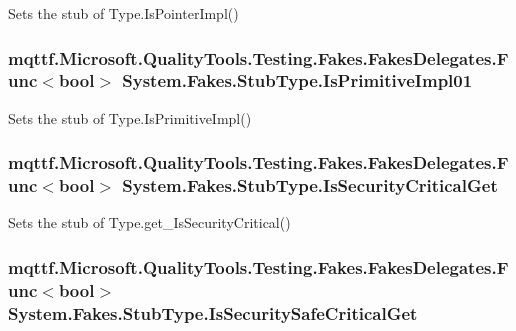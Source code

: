 Sets the stub of Type.\-Is\-Pointer\-Impl()

\hypertarget{class_system_1_1_fakes_1_1_stub_type_ad0e97888ae27234b9f27c85be2345157}{
\subsubsection[{Is\-Primitive\-Impl01}]{\setlength{\rightskip}{0pt plus 5cm}mqttf.\-Microsoft.\-Quality\-Tools.\-Testing.\-Fakes.\-Fakes\-Delegates.\-Func$<$bool$>$ System.\-Fakes.\-Stub\-Type.\-Is\-Primitive\-Impl01}}\label{class_system_1_1_fakes_1_1_stub_type_ad0e97888ae27234b9f27c85be2345157}


Sets the stub of Type.\-Is\-Primitive\-Impl()

\hypertarget{class_system_1_1_fakes_1_1_stub_type_a71c8ce2b830bc88542835ef697e84efb}{
\subsubsection[{Is\-Security\-Critical\-Get}]{\setlength{\rightskip}{0pt plus 5cm}mqttf.\-Microsoft.\-Quality\-Tools.\-Testing.\-Fakes.\-Fakes\-Delegates.\-Func$<$bool$>$ System.\-Fakes.\-Stub\-Type.\-Is\-Security\-Critical\-Get}}\label{class_system_1_1_fakes_1_1_stub_type_a71c8ce2b830bc88542835ef697e84efb}


Sets the stub of Type.\-get\-\_\-\-Is\-Security\-Critical()

\hypertarget{class_system_1_1_fakes_1_1_stub_type_a09fe9c50e1a21a8eb8120e1b9b96c987}{
\subsubsection[{Is\-Security\-Safe\-Critical\-Get}]{\setlength{\rightskip}{0pt plus 5cm}mqttf.\-Microsoft.\-Quality\-Tools.\-Testing.\-Fakes.\-Fakes\-Delegates.\-Func$<$bool$>$ System.\-Fakes.\-Stub\-Type.\-Is\-Security\-Safe\-Critical\-Get}}\label{class_system_1_1_fakes_1_1_stub_type_a09fe9c50e1a21a8eb8120e1b9b96c987}


